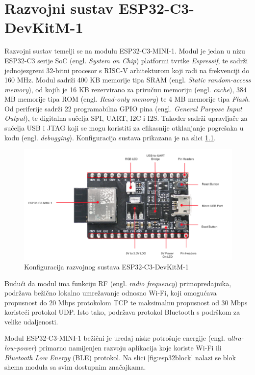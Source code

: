 \chapter{Razvojni sustav ESP32-C3-DevKitM-1}

Razvojni sustav temelji se na modulu ESP32-C3-MINI-1. Modul je jedan u nizu ESP32-­C3 serije SoC (engl. \textit{System on Chip}) platformi tvrtke \textit{Espressif}, te sadrži jednojezgreni 32-bitni procesor s RISC-V arhitekturom koji radi na frekvenciji do 160 MHz. Modul sadrži 400 KB memorije tipa SRAM (engl. \textit{Static random-access memory}), od kojih je 16 KB rezervirano za priručnu memoriju (engl. \textit{cache}), 384 MB memorije tipa ROM (engl. \textit{Read-only memory}) te 4 MB memorije tipa \textit{Flash}. Od periferije sadrži 22 programabilna GPIO pina (engl. \textit{General Purpose Input Output}), te digitalna sučelja SPI, UART, I2C i I2S. Također sadrži upravljače za sučelja USB i JTAG koji se mogu koristiti za efikasnije otklanjanje pogrešaka u kodu (engl. \textit{debugging}). \cite{esp32manual} Konfiguracija sustava prikazana je na slici \ref{fig:esp32}.

\begin{figure}[ht]
	\centering
	\includegraphics[scale=0.6]{imgs/esp32}
	\caption{Konfiguracija razvojnog sustava ESP32-C3-DevKitM-1 \cite{espressif}}
	\label{fig:esp32}
\end{figure}

Budući da modul ima funkciju RF (engl. \textit{radio frequency}) primopredajnika, podržava bežično lokalno umrežavanje odnosno Wi-Fi, koji omogućava propusnost do 20 Mbps protokolom TCP te maksimalnu propusnost od 30 Mbps koristeći protokol UDP. Isto tako, podržava protokol Bluetooth s podrškom za velike udaljenosti. 

Modul ESP32-C3-MINI-1 bežični je uređaj niske potrošnje energije (engl. \textit{ultra-low-power}) primarno namijenjen razvoju aplikacija koje koriste Wi-Fi ili \textit{Bluetooth Low Energy} (BLE) protokol. Na slici \ref{fig:esp32block} nalazi se blok shema modula sa svim dostupnim značajkama. 

